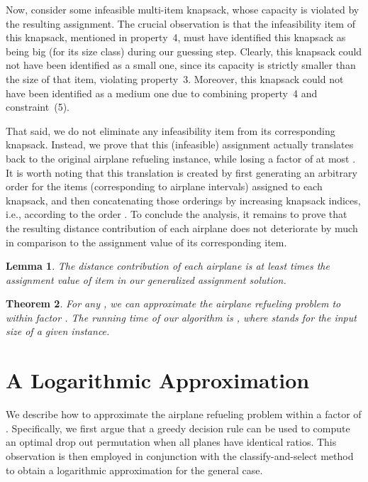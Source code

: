 \documentclass[11pt]{article}
\theoremstyle{plain}
\newtheorem{theorem}{Theorem}[section]
\newtheorem{lemma}[theorem]{Lemma}
\theoremstyle{definition}
\begin{document}
Now, consider some infeasible multi-item knapsack, whose capacity is violated by the resulting assignment. The crucial observation is that the infeasibility item of this knapsack, mentioned in property~4, must have identified this knapsack as being big (for its size class) during our guessing step. Clearly, this knapsack could not have been identified as a small one, since its capacity is strictly smaller than the size of that item, violating property~3. Moreover, this knapsack could not have been identified as a medium one due to combining property~4 and constraint~(5).

That said, we do not eliminate any infeasibility item from its corresponding knapsack. Instead, we prove that this (infeasible) assignment actually translates back to the original airplane refueling instance, while losing a factor of at most . It is worth noting that this translation is created by first generating an arbitrary order for the items (corresponding to airplane intervals) assigned to each knapsack, and then concatenating those orderings by increasing knapsack indices, i.e., according to the order . To conclude the analysis, it remains to prove that the resulting distance contribution of each airplane does not deteriorate by much in comparison to the assignment value of its corresponding item.

\begin{lemma} \label{lem:items_vs_airplanes}
The distance contribution of each airplane  is at least  times the assignment value of item  in our generalized assignment solution.
\end{lemma}

\begin{theorem} \label{thm:pseudoapprox}
For any , we can approximate the airplane refueling problem to within factor . The running time of our algorithm is , where  stands for the input size of a given instance.
\end{theorem}




\appendix


\section{A Logarithmic Approximation} \label{app:log_approx}

We describe how to approximate the airplane refueling problem within a factor of . Specifically, we first argue that a greedy decision rule can be used to compute an optimal drop out permutation when all planes have identical  ratios. This observation is then employed in conjunction with the classify-and-select method to obtain a logarithmic approximation for the general case.
\end{document}
